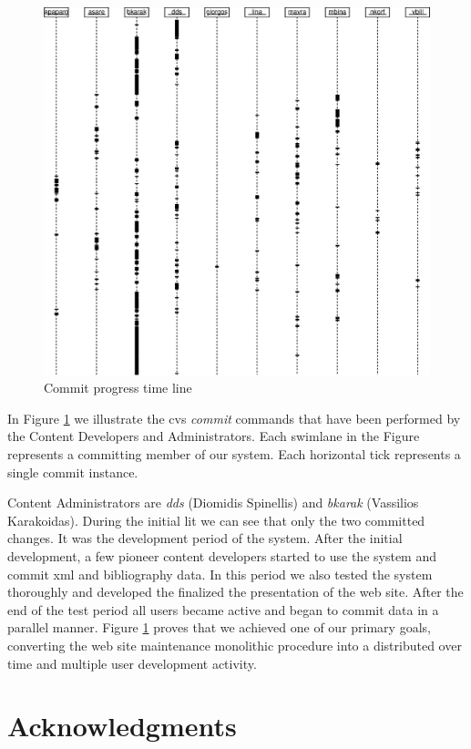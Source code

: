 \documentclass[10pt]{article}
\begin{document}
\begin{figure}[h!]
\includegraphics[scale=0.6]{cvs-log.eps}
\caption{Commit progress time line}
\label{fig:cvs-log}
\end{figure}

In Figure \ref{fig:cvs-log} we illustrate the {\sc cvs} \textit{commit} commands that have been performed by
the Content Developers and Administrators. Each swimlane in the Figure represents a committing
member of our system. Each horizontal tick represents a single commit instance.

Content Administrators are \textit{dds} (Diomidis Spinellis) and \textit{bkarak} (Vassilios Karakoidas). 
During the initial lit we can see that only the two committed 
changes. It was the development period of the system. After the initial development, a few 
pioneer content developers started to use the system and commit {\sc xml} and bibliography data. In this period 
we also tested the system thoroughly and developed the finalized the presentation of the web site. After the end of
the test period all users became active and began to commit data in a parallel manner. Figure \ref{fig:cvs-log} proves that we achieved 
one of our primary goals, converting the web site maintenance monolithic procedure into a distributed over time and multiple user development activity.

\section{Acknowledgments}
\label{sec:ack}
\end{document}
